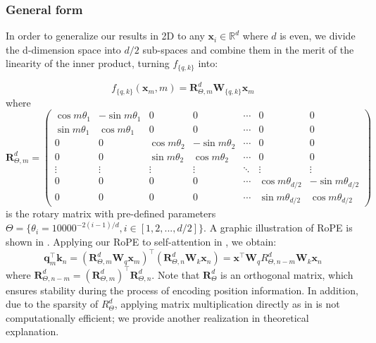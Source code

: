 \documentclass{article}
\def\q{{\boldsymbol q}}
\def\k{{\boldsymbol k}}
\def\x{{\boldsymbol x}}
\def\W{{\boldsymbol W}}
\def\R{{\boldsymbol R}}
\begin{document}
\subsubsection{General form}\label{subsec:general-form}
In order to generalize our results in 2D to any $\x_i \in \mathbb{R}^d$ where $d$ is even,  we divide the d-dimension space into $d/2$ sub-spaces and combine them in the merit of the linearity of the inner product, turning $f_{\{q, k\}}$ into: 

\begin{equation}
	f_{\{q, k\}}(\x_m, m) = \R^d_{\Theta, m}\W_{\{q, k\}}\x_m 
	\label{fn:rope-fqk}
\end{equation}
where 
\begin{equation}    
	\R^d_{\Theta,m} = 
	\begin{pmatrix}
		\cos{m\theta_1}& -\sin{m\theta_1}&0&0&\cdots&0&0\\
		\sin{m\theta_1}&\cos{m\theta_1}&0&0&\cdots&0&0 \\
		0&0&\cos{m\theta_2}& -\sin{m\theta_2}&\cdots&0&0\\
		0&0&\sin{m\theta_2}&\cos{m\theta_2}&\cdots&0&0 \\
		\vdots&\vdots&\vdots&\vdots&\ddots&\vdots&\vdots\\
		0&0&0&0&\cdots&\cos{m\theta_{d/2}}& -\sin{m\theta_{d/2}}\\
		0&0&0&0&\cdots&\sin{m\theta_{d/2}}&\cos{m\theta_{d/2}}
	\end{pmatrix}
	\label{fn:rope-RMat}
\end{equation}
is the rotary matrix with pre-defined parameters $\Theta = \{\theta_i=10000^{-2(i-1)/d}, i \in [1, 2, ..., d/2]\}$. A graphic illustration of RoPE is shown in . Applying our RoPE to self-attention in , we obtain:
\begin{equation}
	\q_m^{\intercal}\k_n %
	=(\R^d_{\Theta, m}\W_q\x_m)^\intercal(\R^d_{\Theta, n}\W_k\x_n) =\x^\intercal\W_qR^d_{\Theta, n-m}\W_k\x_n
	\label{fn:rope-qk}
\end{equation}
where $\R^d_{\Theta, n-m}=(\R^{d}_{\Theta, m})^\intercal\R^d_{\Theta, n}$. Note that $\R^d_\Theta$ is an orthogonal matrix, which ensures stability during the process of encoding position information. In addition, due to the sparsity of $R^d_\Theta$, applying matrix multiplication directly as in  is not computationally efficient; we provide another realization in theoretical explanation.
\end{document}
